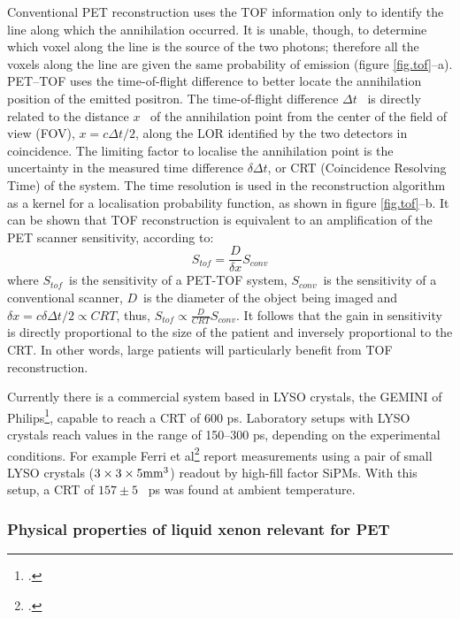 Conventional PET reconstruction uses the TOF information only to identify the line along which the annihilation occurred. It is unable, though, to determine which voxel along the line is the source of the two photons; therefore all the voxels along the line are given the same probability of emission (figure \ref{fig.tof}--a). PET--TOF uses the time-of-flight difference to better locate the annihilation position of the emitted positron. The time-of-flight  difference $\Delta t$~ is directly related to the distance $x$~ of the annihilation point from the center of the field of view (FOV), $x = c \Delta t/2$, along the LOR identified by the two detectors in coincidence. The limiting factor to localise the annihilation point is the uncertainty in the measured time difference $\delta \Delta t$, or CRT (Coincidence Resolving Time) of the system. The time resolution is used in the reconstruction algorithm as a kernel for a localisation probability function, as shown in figure \ref{fig.tof}--b. It can be shown that TOF reconstruction is equivalent to an amplification of the PET scanner sensitivity, according to:
%
\begin{equation}
S_{tof} = \frac{D}{\delta x} S_{conv}
\label{eq.sensiTOF}
\end{equation}
%
where $S_{tof}$~is the sensitivity of a PET-TOF system, $S_{conv}$~is the sensitivity of a conventional scanner, 
$D$~is the diameter of the object being imaged and $\delta x = c \delta \Delta t/2 \propto CRT$, 
thus, $S_{tof} \propto \frac{D}{CRT} S_{conv}$. It follows that the gain in sensitivity is directly proportional to the size of the patient and inversely proportional to the CRT. In other words, large patients will particularly benefit from TOF reconstruction.

Currently there is a commercial system based in LYSO crystals, the GEMINI of Philips\footcite{GEMINI}, capable to reach a CRT of 600 ps. Laboratory setups with LYSO crystals reach values in the range of 150--300 ps, depending on the experimental conditions. For example Ferri et al\footcite{LysoFBK}
 report measurements using a pair of small LYSO crystals 
($3 \times 3 \times 5 {\rm mm^3}$) readout by high-fill factor SiPMs. With this setup, a CRT of $157\pm 5$~ ps was found at ambient temperature.

\subsubsection*{Physical properties of liquid xenon relevant for PET}

